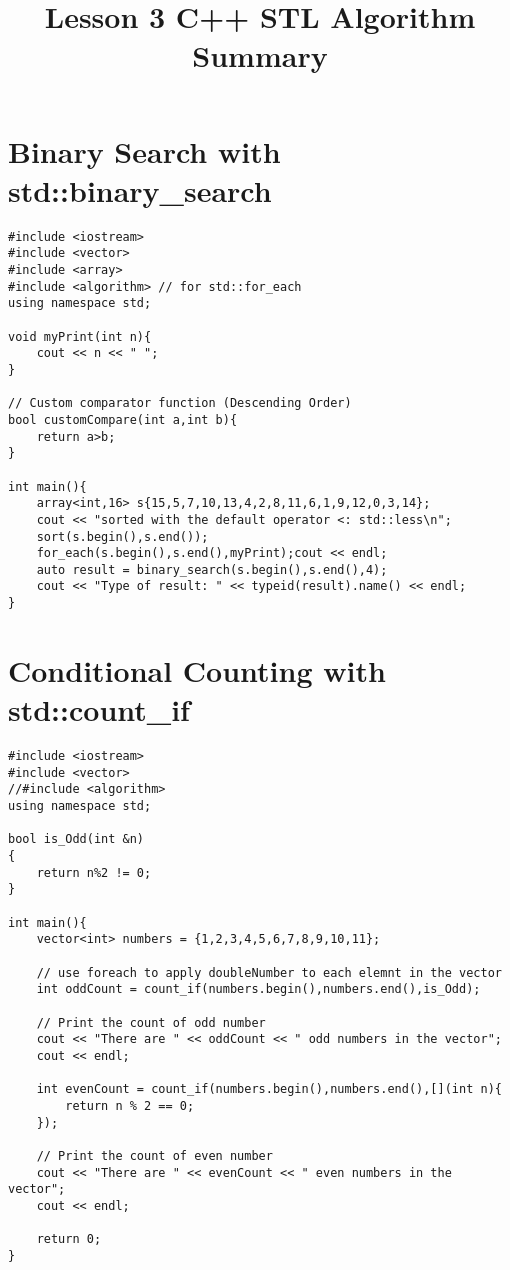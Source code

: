 \documentclass[12pt]{article}
\title{Lesson 3 C++ STL Algorithm Summary}
\author{}
\date{}
\begin{document}
\maketitle
\tableofcontents
\newpage

\section*{Binary Search with std::binary_search}
\begin{verbatim}
#include <iostream>
#include <vector>
#include <array>
#include <algorithm> // for std::for_each
using namespace std;

void myPrint(int n){
    cout << n << " ";
}

// Custom comparator function (Descending Order)
bool customCompare(int a,int b){
    return a>b;
}

int main(){
    array<int,16> s{15,5,7,10,13,4,2,8,11,6,1,9,12,0,3,14};
    cout << "sorted with the default operator <: std::less\n";
    sort(s.begin(),s.end());
    for_each(s.begin(),s.end(),myPrint);cout << endl;
    auto result = binary_search(s.begin(),s.end(),4);
    cout << "Type of result: " << typeid(result).name() << endl;
}
\end{verbatim}


\section*{Conditional Counting with std::count_if}
\begin{verbatim}
#include <iostream>
#include <vector>
//#include <algorithm>
using namespace std;

bool is_Odd(int &n)
{
    return n%2 != 0;
}

int main(){
    vector<int> numbers = {1,2,3,4,5,6,7,8,9,10,11};

    // use foreach to apply doubleNumber to each elemnt in the vector
    int oddCount = count_if(numbers.begin(),numbers.end(),is_Odd);

    // Print the count of odd number
    cout << "There are " << oddCount << " odd numbers in the vector";
    cout << endl;
    
    int evenCount = count_if(numbers.begin(),numbers.end(),[](int n){
        return n % 2 == 0;
    });
    
    // Print the count of even number
    cout << "There are " << evenCount << " even numbers in the vector";
    cout << endl;

    return 0;
}
\end{verbatim}
\end{document}
